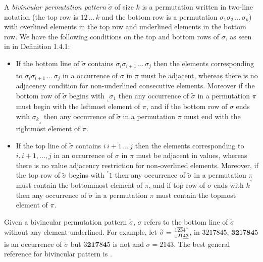 \documentclass[a4paper]{llncs}
\newcommand\BV[2]{\genfrac{}{}{0pt}{}{#1}{#2}}
\begin{document}
A \emph{bivincular permutation pattern} $\widetilde{\sigma}$
of size $k$ is a permutation written in
two-line notation
(the top row is $12\,\ldots\,k$ and the bottom row
is a permutation $\sigma_1\sigma_2\,\ldots\,\sigma_k$)
with overlined elements in the top row and underlined elements in the bottom row.
We have the following conditions on the top and bottom rows
of $\sigma$, as seen in \cite{Kitaev:book:2011} in Definition 1.4.1:
\begin{itemize}
	\item
	If the bottom line of $\widetilde{\sigma}$ contains
	$\underline{\sigma_i\sigma_{i+1}\,\ldots\,\sigma_j}$
	then the elements corresponding to
	$\sigma_i\sigma_{i+1}\,\ldots\,\sigma_j$ in a occurrence of
	$\sigma$ in $\pi$ must be adjacent, whereas there is
	no adjacency condition for
	non-underlined consecutive elements.
	Moreover if the bottom row of $\widetilde{\sigma}$ begins with
	$_\llcorner{\sigma_1}$ then any occurrence of $\widetilde{\sigma}$
	in a permutation $\pi$ must begin with the leftmost
	element of $\pi$,
	and
	if the bottom row of $\sigma$ ends with
	${\sigma_k}_\lrcorner$ then any occurrence of $\widetilde{\sigma}$
	in a permutation $\pi$ must end with the rightmost
	element of $\pi$.
	\item
	If the top line of $\widetilde{\sigma}$ contains
	$\overline{i\,i+1\,\ldots\,j}$ then the elements corresponding to
	$i, i+1, \ldots, j$ in an
	occurrence of $\sigma$ in $\pi$ must be adjacent in values,
	whereas there is no value adjacency restriction for non-overlined
	elements.
	Moreover, if the top row of $\widetilde{\sigma}$ begins with
	$^\ulcorner{1}$ then
	any occurrence of $\widetilde{\sigma}$ in a permutation $\pi$ must contain 
	the bottommost element of $\pi$, and
	if top row of $\sigma$ ends with $k^\urcorner$ then
	any occurrence of $\widetilde{\sigma}$ in a permutation $\pi$ must contain
	the topmost element of $\pi$.
\end{itemize}

Given a bivincular permutation pattern $\widetilde{\sigma}$,
$\sigma$ refers to the bottom line of $\widetilde{\sigma}$
without any element underlined.
For example,
let
$\widetilde{\sigma} = \BV{1\overline{23}4\urcorner}{\llcorner 21\underline{43}}$,
in $3217845$, $\textbf{32}17\textbf{84}5$ is an occurrence  of $\widetilde{\sigma}$ but $3\textbf{21}\textbf{7}8\textbf{4}5$ is not
and $\sigma = 2143$.
The best general reference for bivincular pattern is \cite{Kitaev:book:2011}.
\end{document}
